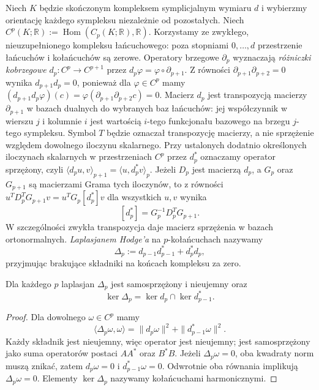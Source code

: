 \begin{definicja}
Niech $K$ będzie skończonym kompleksem
symplicjalnym wymiaru $d$ i wybierzmy orientację
każdego sympleksu niezależnie od pozostałych.
Niech $C^p(K;\mathbb R):=
\operatorname{Hom}(C_p(K;\mathbb R),\mathbb R)$.
Korzystamy ze zwykłego, nieuzupełnionego kompleksu
łańcuchowego: poza stopniami $0,\ldots,d$
przestrzenie łańcuchów i kołańcuchów są zerowe.
Operatory brzegowe $\partial_p$ wyznaczają
\emph{różniczki kobrzegowe}
$d_p:C^p\to C^{p+1}$ przez $d_p\varphi=\varphi\circ\partial_{p+1}$.
Z równości $\partial_{p+1}\partial_{p+2}=0$
wynika $d_{p+1}d_p=0$, ponieważ dla $\varphi\in C^p$
mamy $(d_{p+1}d_p\varphi)(c)=
\varphi(\partial_{p+1}\partial_{p+2}c)=0$.
Macierz $d_p$ jest transpozycją macierzy
$\partial_{p+1}$ w bazach dualnych do wybranych
baz łańcuchów: jej współczynnik w wierszu $j$
i kolumnie $i$ jest wartością $i$-tego funkcjonału
bazowego na brzegu $j$-tego sympleksu.
Symbol $T$ będzie oznaczał transpozycję macierzy,
a nie sprzężenie względem dowolnego iloczynu
skalarnego. Przy ustalonych dodatnio określonych iloczynach skalarnych
w przestrzeniach $C^p$ przez $d_p^*$ oznaczamy
operator sprzężony, czyli
$\langle d_pu,v\rangle_{p+1}=\langle u,d_p^*v\rangle_p$.
Jeżeli $D_p$ jest macierzą $d_p$, a $G_p$ oraz
$G_{p+1}$ są macierzami Grama tych iloczynów,
to z równości $u^TD_p^TG_{p+1}v
=u^TG_p[d_p^*]v$ dla wszystkich $u,v$
wynika
\[
 [d_p^*]=G_p^{-1}D_p^TG_{p+1}.
\]
W szczególności zwykła transpozycja daje macierz
sprzężenia w bazach ortonormalnych. \emph{Laplasjanem Hodge'a}
na $p$-kołańcuchach nazywamy
\[
\Delta_p:=d_{p-1}d_{p-1}^*+d_p^*d_p,
\]
przyjmując brakujące składniki na końcach
kompleksu za zero.
\end{definicja}

\begin{stwierdzenie}
Dla każdego $p$ laplasjan $\Delta_p$ jest
samosprzężony i nieujemny oraz
\[
\ker\Delta_p=\ker d_p\cap\ker d_{p-1}^*.
\]
\end{stwierdzenie}

\begin{proof}
Dla dowolnego $\omega\in C^p$ mamy
\[
\langle\Delta_p\omega,\omega\rangle
=\|d_p\omega\|^2+\|d_{p-1}^*\omega\|^2.
\]
Każdy składnik jest nieujemny, więc operator jest
nieujemny; jest samosprzężony jako suma operatorów
postaci $AA^*$ oraz $B^*B$. Jeżeli $\Delta_p\omega=0$,
oba kwadraty norm muszą znikać, zatem
$d_p\omega=0$ i $d_{p-1}^*\omega=0$.
Odwrotnie oba równania implikują
$\Delta_p\omega=0$. Elementy $\ker\Delta_p$
nazywamy kołańcuchami harmonicznymi.
\end{proof}

